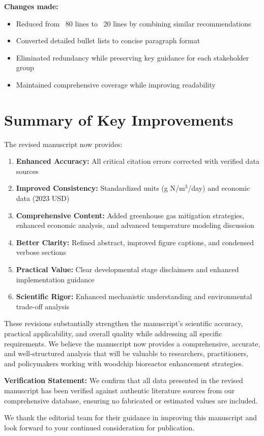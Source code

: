 \documentclass[12pt,a4paper]{article}
\begin{document}
\textbf{Changes made:}
\begin{itemize}
\item Reduced from ~80 lines to ~20 lines by combining similar recommendations
\item Converted detailed bullet lists to concise paragraph format
\item Eliminated redundancy while preserving key guidance for each stakeholder group
\item Maintained comprehensive coverage while improving readability
\end{itemize}

\section*{Summary of Key Improvements}

The revised manuscript now provides:

\begin{enumerate}
\item \textbf{Enhanced Accuracy:} All critical citation errors corrected with verified data sources
\item \textbf{Improved Consistency:} Standardized units (g N/m$^3$/day) and economic data (2023 USD)
\item \textbf{Comprehensive Content:} Added greenhouse gas mitigation strategies, enhanced economic analysis, and advanced temperature modeling discussion
\item \textbf{Better Clarity:} Refined abstract, improved figure captions, and condensed verbose sections
\item \textbf{Practical Value:} Clear developmental stage disclaimers and enhanced implementation guidance
\item \textbf{Scientific Rigor:} Enhanced mechanistic understanding and environmental trade-off analysis
\end{enumerate}

These revisions substantially strengthen the manuscript's scientific accuracy, practical applicability, and overall quality while addressing all specific requirements. We believe the manuscript now provides a comprehensive, accurate, and well-structured analysis that will be valuable to researchers, practitioners, and policymakers working with woodchip bioreactor enhancement strategies.

\textbf{Verification Statement:} We confirm that all data presented in the revised manuscript has been verified against authentic literature sources from our comprehensive database, ensuring no fabricated or estimated values are included.

We thank the editorial team for their guidance in improving this manuscript and look forward to your continued consideration for publication.
\end{document}
